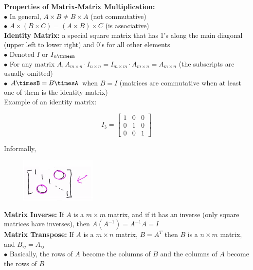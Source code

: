 \documentclass{article}
\begin{document}
        \pagebreak
        \noindent \textbf{Properties of Matrix-Matrix Multiplication:} \\
        $\bullet$ In general, $A\times B\not = B\times A$ (not commutative) \\
        $\bullet$ $A\times(B\times C)=(A\times B)\times C$ (is associative) \\

        \noindent \textbf{Identity Matrix:} a special square matrix that has 1's along the main diagonal
        (upper left to lower right) and 0's for all other elements \\
        $\bullet$ Denoted $I$ or $I_{n\timesm}$ \\
        $\bullet$ For any matrix $A,A_{m\times n}\cdot I_{n\times n}=I_{m\times m}\cdot A_{m\times n}=
        A_{m\times n}$ (the subscripts are usually omitted) \\
        $\bullet$ $A\timesB=B\timesA$ when $B=I$ (matrices are commutative when at least one of them is the
        identity matrix) \\

        \noindent Example of an identity matrix:

        \begin{equation*}
            I_3 =
            \begin{bmatrix}
                1 & 0 & 0 \\
                0 & 1 & 0 \\
                0 & 0 & 1
            \end{bmatrix}
        \end{equation*}

        \noindent Informally,

        \begin{figure}[hbt!]
            \centering
            \includegraphics[scale=1.2]{Resources/Identity2}
        \end{figure}

        \noindent \textbf{Matrix Inverse:} If $A$ is a $m\times m$ matrix, and if it has an inverse
        (only square matrices have inverses), then $A(A^{-1})=A^{-1}A=I$ \\

        \noindent \textbf{Matrix Transpose:} If $A$ is a $m\times n$ matrix, $B=A^T$ then $B$ is a $n\times m$
        matrix, and $B_{ij}=A_{ij}$ \\
        $\bullet$ Basically, the rows of $A$ become the columns of $B$ and the columns of $A$ become the
        rows of $B$
\end{document}
